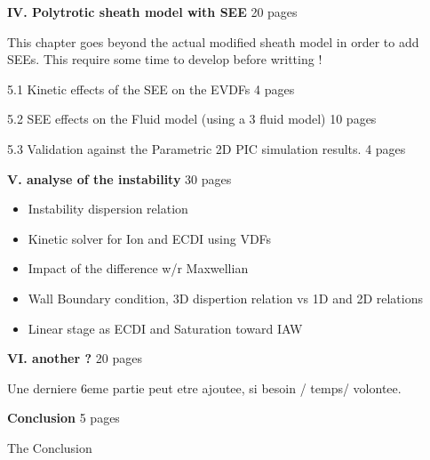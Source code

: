 {\bf IV. Polytrotic sheath model with SEE} 20 pages
\begin{zzz}
  This chapter goes beyond the actual modified sheath model in order to add SEEs.
  This require some time to develop before writting !

  5.1 Kinetic effects of the SEE on the EVDFs  4 pages

  5.2 SEE effects on the Fluid model (using a 3 fluid model)  10 pages

  5.3 Validation against the Parametric 2D PIC simulation results. 4 pages
\end{zzz}

{\bf V. analyse of the instability } 30 pages
\begin{zzz}
  \begin{itemize}
\item Instability dispersion relation
\item Kinetic solver for Ion and ECDI using VDFs
\item Impact of the difference w/r Maxwellian
\item Wall Boundary condition, 3D dispertion relation vs 1D and 2D relations
\item Linear stage as ECDI and Saturation toward IAW
\end{itemize}
\end{zzz}


{\bf VI. another ? } 20 pages

Une derniere 6eme partie peut etre ajoutee, si besoin / temps/ volontee.

\linebreak
{\bf Conclusion } 5 pages
\begin{zzz}
The Conclusion
\end{zzz}

